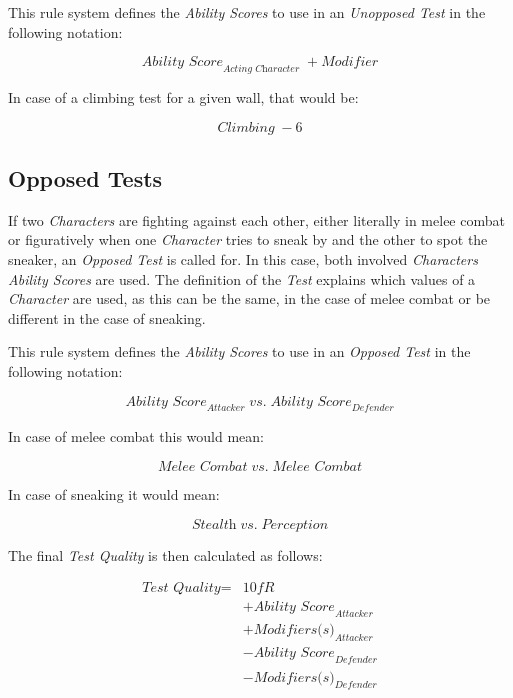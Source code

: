 This rule system defines the \emph{Ability Scores} to use in an
\emph{Unopposed Test} in the following notation:

\begin{equation}
    \textit{Ability Score}_\textit{Acting Character} \; + \textit{Modifier}
\end{equation}

In case of a climbing test for a given wall, that would be:

\begin{equation*}
    \textit{Climbing} \; -6
\end{equation*}

\subsection{Opposed Tests}

If two \emph{Characters} are fighting against each other, either literally in melee
combat or figuratively when one \emph{Character} tries to sneak by and the other to
spot the sneaker, an \emph{Opposed Test} is called for. In this case, both involved
\emph{Characters} \emph{Ability Scores} are used. The definition of the \emph{Test}
explains which values of a \emph{Character} are used, as this can be the same, in the
case of melee combat or be different in the case of sneaking.

This rule system defines the \emph{Ability Scores} to use in an
\emph{Opposed Test} in the following notation:

\begin{equation}
    \textit{Ability Score}_\textit{Attacker} \; \textit{vs.} \; \textit{Ability Score}_\textit{Defender}
\end{equation}

In case of melee combat this would mean:

\begin{equation*}
    \textit{Melee Combat} \; \textit{vs.} \; \textit{Melee Combat}
\end{equation*}

In case of sneaking it would mean:

\begin{equation*}
    \textit{Stealth} \; \textit{vs.} \; \textit{Perception}
\end{equation*}

The final \emph{Test Quality} is then calculated as follows:

\begin{equation}
    \begin{split}
        \textit{Test Quality} = {} & \textit{10fR} \\
        & + \textit{Ability Score}_\textit{Attacker} \\
        & + \textit{Modifiers(s)}_\textit{Attacker} \\
        & - \textit{Ability Score}_\textit{Defender} \\
        & - \textit{Modifiers(s)}_\textit{Defender} \\
    \end{split}
\end{equation}

